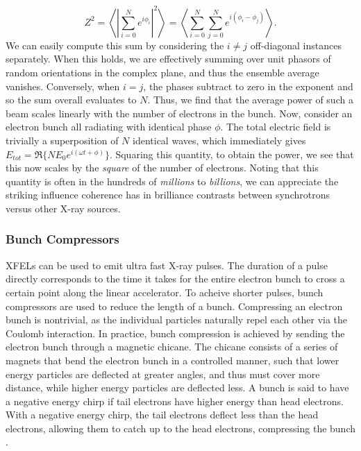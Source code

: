 \documentclass[aps,prb,twocolumn,superscriptaddress]{revtex4-2}
\begin{document}
\begin{equation}
    Z^2 = \left\langle \left|\sum_{i=0}^N e^{i\phi_i}\right|^2 \right\rangle =
    \left\langle \sum_{i=0}^N \sum_{j=0}^N e^{i(\phi_i - \phi_j)}
    \right\rangle.
\end{equation}
We can easily compute this sum by considering the $i \neq j$ off-diagonal
instances separately. When this holds, we are effectively summing over unit 
phasors of random orientations in the complex plane, and thus the ensemble 
average vanishes. Conversely, when $i = j$, the phases subtract to zero in the 
exponent and so the sum overall evaluates to $N$. Thus, we find that the 
average power of such a beam scales linearly with the number of electrons in
the bunch. Now, consider an electron bunch all radiating with identical phase
$\phi$. The total electric field is trivially a superposition of $N$ identical
waves, which immediately gives $E_{tot} = \Re \{ NE_0e^{i(\omega t + \phi)} \}$.
Squaring this quantity, to obtain the power, we see that this now scales by the 
\textit{square} of the number of electrons. Noting that this quantity is often
in the hundreds of \textit{millions} to \textit{billions}, we can appreciate
the striking influence coherence has in brilliance contrasts between 
synchrotrons versus other X-ray sources.


\subsubsection{Bunch Compressors}
XFELs can be used to emit ultra fast X-ray pulses. The duration of a pulse
directly corresponds to the time it takes for the entire electron bunch to 
cross a certain point along the linear accelerator. To acheive shorter pulses,
bunch compressors are used to reduce the length of a bunch. 
Compressing an electron bunch is nontrivial, as the individual particles 
naturally repel each other via the Coulomb interaction. In practice, bunch 
compression is achieved by sending the electron bunch through a magnetic chicane.
The chicane consists of a series of magnets that bend the electron bunch in a
controlled manner, such that lower energy particles are deflected at greater 
angles, and thus must cover more distance, while higher energy particles are
deflected less. A bunch is said to have a negative energy chirp if tail electrons 
have higher energy than head electrons. With a negative energy chirp, the tail
electrons deflect less than the head electrons, allowing them to catch up to 
the head electrons, compressing the bunch \cite{Hastings2020}.
\end{document}
